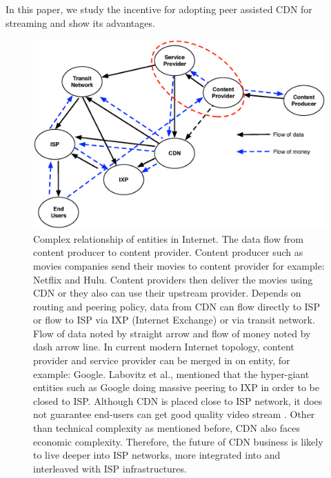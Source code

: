 \documentclass[paper]{ieice}
\begin{document}
In this paper, we study the incentive for adopting peer assisted CDN for streaming and show its advantages.


\begin{figure}[tb]
\begin{center}
\includegraphics[scale=0.4]{graphs/business-relationship.eps}
\end{center}
\caption{Complex relationship of entities in Internet.
The data flow from content producer to content provider. 
Content producer such as movies companies send their movies to content provider for example: Netflix and Hulu.
Content providers then deliver the movies using CDN or they also can use their upstream provider.
Depends on routing and peering policy, data from CDN can flow directly to ISP or flow to ISP via IXP (Internet Exchange) or via transit network. 
Flow of data noted by straight arrow and flow of money noted by dash arrow line.
In current modern Internet topology, content provider and service provider can be merged in on entity, for example: Google.
Labovitz et al.,\cite{Labovitz:2010:IIT:2043164.1851194} mentioned that the hyper-giant entities such as Google doing massive peering to IXP in order to be closed to ISP. 
Although CDN is placed close to ISP network, it does not guarantee end-users can get good quality video stream \cite{Krishnan:2009:MBE:1644893.1644917}.
Other than technical complexity as mentioned before, CDN also faces economic complexity\cite{dispute}.
Therefore, the future of CDN business is likely to live deeper into ISP networks, more integrated into and interleaved with ISP infrastructures.}
\label{fig:businessrelationship}
\vspace{-2mm}
\end{figure} 
\end{document}
